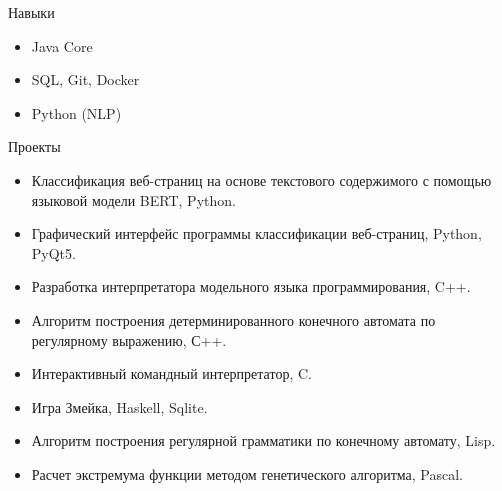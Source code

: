 \documentclass{resume} %
\begin{document}
\begin{rSection}{Навыки}
\begin{itemize}
  \item Java Core
  \item SQL, Git, Docker
  \item Python (NLP)
\end{itemize}
\end{rSection}



\begin{rSection}{Проекты}
\begin{itemize}
\item {Классификация веб-страниц на основе текстового содержимого с помощью языковой модели BERT, Python.} 
\item {Графический интерфейс программы классификации веб-страниц, Python, PyQt5.} 
\item {Разработка интерпретатора модельного языка программирования, C++.} 
\item {Алгоритм построения детерминированного конечного автомата по регулярному выражению, С++.} 
\item {Интерактивный командный интерпретатор, C.} 
\item {Игра \textquotedbl{}Змейка\textquotedbl{}, Haskell, Sqlite.} 
\item {Алгоритм построения регулярной грамматики по конечному автомату, Lisp.} 
\item {Расчет экстремума функции методом генетического алгоритма, Pascal.} 
\end{itemize}
\end{rSection} 





\end{document}
